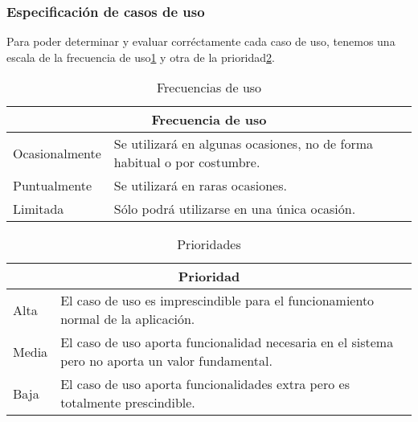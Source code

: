 \subsubsection{Especificación de casos de uso}
Para poder determinar y evaluar corréctamente cada caso de uso, tenemos una escala de la frecuencia de uso\ref{tab_frec_uso} y otra de la prioridad\ref{tab_prior}.

\begin{table}[htpb]
\centering
\caption{Frecuencias de uso}
\label{tab_frec_uso}
\begin{tabularx}{\textwidth}{|l|X|}
\hline
\multicolumn{2}{|c|}{Frecuencia de uso}                                                   \\ \hline
Ocasionalmente & Se utilizará en algunas ocasiones, no de forma habitual o por costumbre. \\ \hline
Puntualmente   & Se utilizará en raras ocasiones.                                         \\ \hline
Limitada       & Sólo podrá utilizarse en una única ocasión.                              \\ \hline
\end{tabularx}
\end{table}

\begin{table}[htpb]
\centering
\caption{Prioridades}
\label{tab_prior}
\begin{tabularx}{\textwidth}{|l|X|}
\hline
\multicolumn{2}{|c|}{Prioridad}                                                                          \\ \hline
Alta  & El caso de uso es imprescindible para el funcionamiento normal de la aplicación.                 \\ \hline
Media & El caso de uso aporta funcionalidad necesaria en el sistema pero no aporta un valor fundamental. \\ \hline
Baja  & El caso de uso aporta funcionalidades extra pero es totalmente prescindible.                     \\ \hline
\end{tabularx}
\end{table}

%
%

